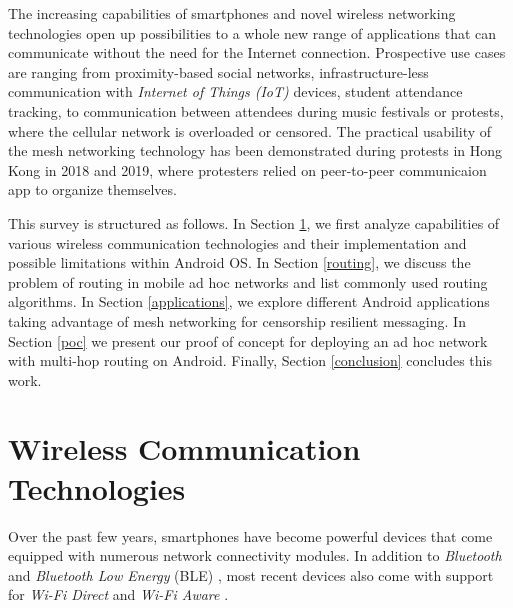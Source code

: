 \documentclass[conference,compsoc]{IEEEtran}
\begin{document}
The increasing capabilities of smartphones and novel wireless networking technologies open up possibilities to a whole new range of applications that can communicate without the need for the Internet connection. Prospective use cases are ranging from proximity-based social networks, infrastructure-less communication with \textit{Internet of Things (IoT)} devices, student attendance tracking, to communication between attendees during music festivals or protests, where the cellular network is overloaded or censored. The practical usability of the mesh networking technology has been demonstrated during protests in Hong Kong in 2018 and 2019, where protesters relied on peer-to-peer communicaion app to organize themselves. \cite{forbes:hk}




This survey is structured as follows. In Section \ref{wirelesstech}, we first analyze capabilities of various wireless communication technologies and their implementation and possible limitations within Android OS. In Section \ref{routing}, we discuss the problem of routing in mobile ad hoc networks and list commonly used routing algorithms.
In Section \ref{applications}, we explore different Android applications taking advantage of mesh networking for censorship resilient messaging. In Section \ref{poc} we present our proof of concept for deploying an ad hoc network with multi-hop routing on Android. Finally, Section \ref{conclusion} concludes this work.

\section{Wireless Communication Technologies} \label{wirelesstech}

Over the past few years, smartphones have become powerful devices that come equipped with numerous network connectivity modules. In addition to \textit{Bluetooth} and \textit{Bluetooth Low Energy} (BLE) \cite{android:ble}, most recent devices also come with support for \textit{Wi-Fi Direct} \cite{android:wifip2p} and \textit{Wi-Fi Aware} \cite{android:wifiaware}.
\end{document}
